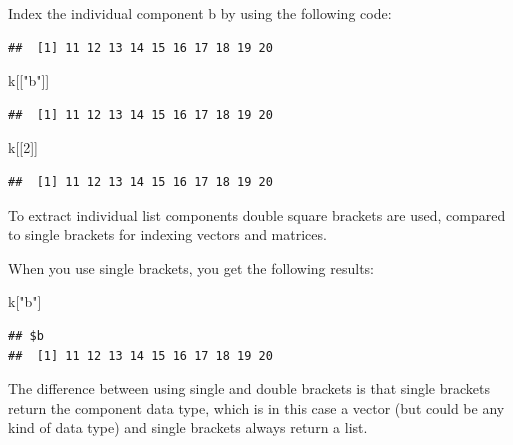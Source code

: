 \documentclass[]{book}
\newenvironment{Shaded}{\begin{snugshade}}{\end{snugshade}}
\newcommand{\DecValTok}[1]{\textcolor[rgb]{0.00,0.00,0.81}{#1}}
\newcommand{\StringTok}[1]{\textcolor[rgb]{0.31,0.60,0.02}{#1}}
\newcommand{\OperatorTok}[1]{\textcolor[rgb]{0.81,0.36,0.00}{\textbf{#1}}}
\newcommand{\NormalTok}[1]{#1}
\begin{document}
Index the individual component b by using the following code:

\begin{Shaded}
\end{Shaded}

\begin{verbatim}
##  [1] 11 12 13 14 15 16 17 18 19 20
\end{verbatim}

\begin{Shaded}
\begin{Highlighting}[]
\NormalTok{k[[}\StringTok{"b"}\NormalTok{]]}
\end{Highlighting}
\end{Shaded}

\begin{verbatim}
##  [1] 11 12 13 14 15 16 17 18 19 20
\end{verbatim}

\begin{Shaded}
\begin{Highlighting}[]
\NormalTok{k[[}\DecValTok{2}\NormalTok{]]}
\end{Highlighting}
\end{Shaded}

\begin{verbatim}
##  [1] 11 12 13 14 15 16 17 18 19 20
\end{verbatim}

To extract individual list components double square brackets are used,
compared to single brackets for indexing vectors and matrices.

When you use single brackets, you get the following results:

\begin{Shaded}
\begin{Highlighting}[]
\NormalTok{k[}\StringTok{"b"}\NormalTok{]}
\end{Highlighting}
\end{Shaded}

\begin{verbatim}
## $b
##  [1] 11 12 13 14 15 16 17 18 19 20
\end{verbatim}

The difference between using single and double brackets is that single
brackets return the component data type, which is in this case a vector
(but could be any kind of data type) and single brackets always return a
list.
\end{document}
